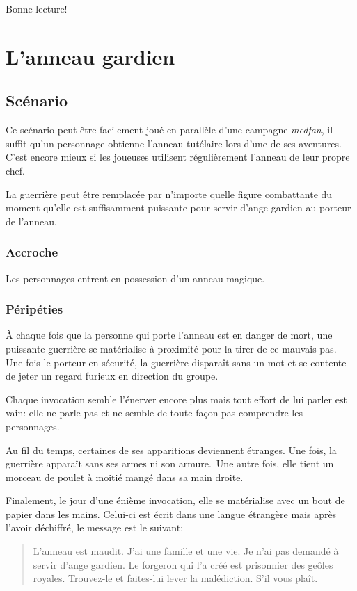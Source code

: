 \documentclass[a5paper,pagesize,10pt,bibliography=totoc,numbers=enddot,
headings=normal,DIV=9,twoside=false,tablecaptionabove]{scrbook}
\begin{document}
Bonne lecture!

\setcounter{tocdepth}{0}
\tableofcontents

\chapter{L'anneau gardien}

\section{Scénario}

Ce scénario peut être facilement joué en parallèle d'une campagne \emph{medfan}, il suffit qu'un personnage obtienne l'anneau tutélaire lors d'une de ses aventures.
C'est encore mieux si les joueuses utilisent régulièrement l'anneau de leur propre chef.

La guerrière peut être remplacée par n'importe quelle figure combattante du moment qu'elle est suffisamment puissante pour servir d'ange gardien au porteur de l'anneau.

\subsection*{Accroche}

Les personnages entrent en possession d'un anneau magique.

\subsection*{Péripéties}

À chaque fois que la personne qui porte l'anneau est en danger de mort, une puissante guerrière se matérialise à proximité pour la tirer de ce mauvais pas.
Une fois le porteur en sécurité, la guerrière disparaît sans un mot et se contente de jeter un regard furieux en direction du groupe.

Chaque invocation semble l'énerver encore plus mais tout effort de lui parler est vain: elle ne parle pas et ne semble de toute façon pas comprendre les personnages.

Au fil du temps, certaines de ses apparitions deviennent étranges.
Une fois, la guerrière apparaît sans ses armes ni son armure. Une autre fois, elle tient un morceau de poulet à moitié mangé dans sa main droite.

Finalement, le jour d'une énième invocation, elle se matérialise avec un bout de papier dans les mains.
Celui-ci est écrit dans une langue étrangère mais après l'avoir déchiffré, le message est le suivant:
\blockquote{L'anneau est maudit. J'ai une famille et une vie. Je n'ai pas demandé à servir d'ange gardien. Le forgeron qui l'a créé est prisonnier des geôles royales. Trouvez-le et faites-lui lever la malédiction. S'il vous plaît.}
\end{document}
